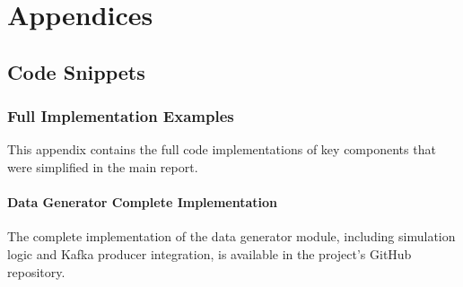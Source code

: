 \appendix
\chapter{Appendices}

\section{Code Snippets}

\subsection{Full Implementation Examples}

This appendix contains the full code implementations of key components that were simplified in the main report.

\subsubsection{Data Generator Complete Implementation}
The complete implementation of the data generator module, including simulation logic and Kafka producer integration, is available in the project's GitHub repository.


